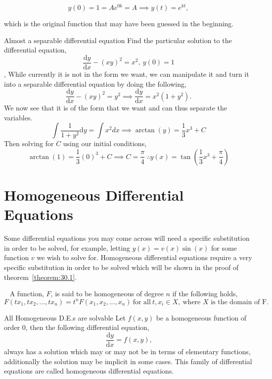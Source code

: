 $$y(0)=1=Ae^{0k}=A \implies y(t)=e^{kt},$$

which is the original function that may have been guessed in the beginning.

\newpage

\begin{example}{Almost a separable differential equation}
Find the particular solution to the differential equation,
$$\frac{\mathrm{d}y}{\mathrm{d}x}-(xy)^2=x^2, \ y(0)=1$$
\sep
While currently it is not in the form we want, we can manipulate it and turn it into a separable differential equation by doing the following,
$$\frac{\mathrm{d}y}{\mathrm{d}x}-(xy)^2=y^2 \implies \frac{\mathrm{d}y}{\mathrm{d}x}=x^2(1+y^2).$$
We now see that it is of the form that we want and can thus separate the variables.
$$\int \frac{1}{1+y^2}\mathrm{d}y=\int x^2dx \implies \arctan(y)=\frac{1}{3}x^3+C$$
Then solving for $C$ using our initial conditions,
$$\arctan(1)=\frac{1}{3}(0)^3+C \implies C=\frac{\pi}{4} \ \therefore y(x)=\tan\left(\frac{1}{3}x^3+\frac{\pi}{4}\right)$$
\end{example}

\section{Homogeneous Differential Equations}
Some differential equations you may come across will need a specific substitution in order to be solved, for example, letting $y(x)=v(x)\sin(x)$ for some function $v$ we wish to solve for. Homogeneous differential equations require a very specific substitution in order to be solved which will be shown in the proof of theorem~\ref{theorem:30.1}.
\begin{definition}{~}
A function, $F$, is said to be homogeneous of degree $n$ if the following holds,
$$F(tx_1,tx_2,...,tx_n)=t^nF(x_1,x_2,...,x_n) \ \text{for all} \ t,x_i \in X, \ \text{where $X$ is the domain of F.}$$
\end{definition}
\begin{theorem}{All Homogeneous D.E.s are solvable}\label{theorem:30.1}
Let $f(x,y)$ be a homogeneous function of order $0$, then the following differential equation,
$$\frac{\mathrm{d}y}{\mathrm{d}x}=f(x,y)\text{,}$$
always has a solution which may or may not be in terms of elementary functions, additionally the solution may be implicit in some cases. This family of differential equations are called homogeneous differential equations.
\end{theorem}

\newpage

